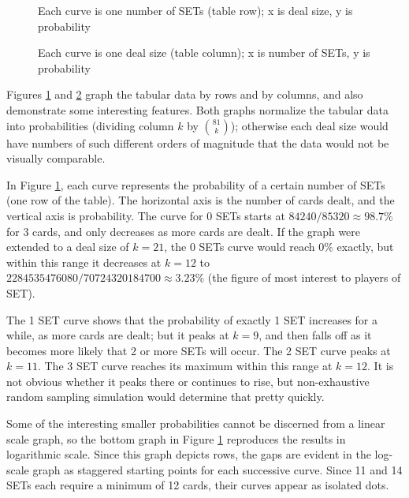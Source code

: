 \documentclass[10pt]{amsart}
\newcommand{\SET}{SET\texttrademark}  %
\begin{document}
\begin{figure}[!htb]
  \caption{\label{FIGROWS} Each curve is one number of SETs (table row); x is
    deal size, y is probability}
\end{figure}

\begin{figure}[!htb]
  \caption{\label{FIGCOLS} Each curve is one deal size (table column); x is
    number of SETs, y is probability}
\end{figure}

Figures \ref{FIGROWS} and \ref{FIGCOLS} graph the tabular data by rows and by
columns, and also demonstrate some interesting features. Both graphs normalize
the tabular data into probabilities (dividing column $k$ by $\binom{81}{k}$);
otherwise each deal size would have numbers of such different orders of
magnitude that the data would not be visually comparable.

In Figure \ref{FIGROWS}, each curve represents the probability of a certain
number of SETs (one row of the table). The horizontal axis is the number of
cards dealt, and the vertical axis is probability. The curve for 0 SETs starts
at $84240/85320\approx 98.7\%$ for 3 cards, and only decreases as more cards are
dealt. If the graph were extended to a deal size of $k=21$, the 0 SETs curve
would reach $0\%$ exactly, but within this range it decreases at $k=12$ to
$2284535476080/70724320184700\approx 3.23\%$ (the figure of most interest to
players of \SET).

The 1 SET curve shows that the probability of exactly 1 SET increases for a
while, as more cards are dealt; but it peaks at $k=9$, and then falls off as it
becomes more likely that 2 or more SETs will occur. The 2 SET curve peaks at
$k=11$. The 3 SET curve reaches its maximum within this range at $k=12$. It is
not obvious whether it peaks there or continues to rise, but non-exhaustive
random sampling simulation would determine that pretty quickly.

Some of the interesting smaller probabilities cannot be discerned from a linear
scale graph, so the bottom graph in Figure \ref{FIGROWS} reproduces the results
in logarithmic scale. Since this graph depicts rows, the gaps are evident in the
log-scale graph as staggered starting points for each successive curve. Since 11
and 14 SETs each require a minimum of 12 cards, their curves appear as isolated
dots.
\end{document}
